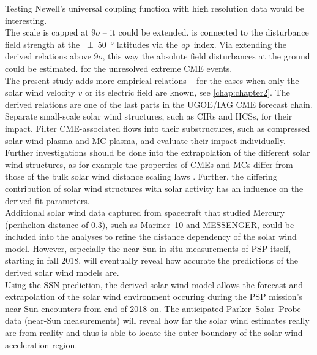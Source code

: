Testing Newell's universal coupling function with high resolution data would be interesting.\\

The \Kp{} scale is capped at $9o$ -- it could be extended. \Kp{} is connected to the disturbance field strength at the \SI{+-50}{\degree} latitudes via the \textit{ap}~index. Via extending the derived \Kp{} relations above $9o$, this way the absolute field disturbances at the ground could be estimated. for the unresolved extreme CME events.\\

The present study adds more empirical \Kp{} relations -- for the cases when only the solar wind velocity $v$ or its electric field \vBz{} are known, see \autoref{chap:chapter2}. The derived \Kp{} relations are one of the last parts in the UGOE/IAG CME forecast chain.\\

Separate small-scale solar wind structures, such as CIRs and HCSs, for their \Kp{} impact. Filter CME-associated flows into their substructures, such as compressed solar wind plasma and MC plasma, and evaluate their \Kp{} impact individually.\\


Further investigations should be done into the extrapolation of the different solar wind structures, as for example the properties of CMEs and MCs differ from those of the bulk solar wind distance scaling laws \citep{Bothmer1998}. Further, the differing contribution of solar wind structures with solar activity has an influence on the derived fit parameters.\\

Additional solar wind data captured from spacecraft that studied Mercury (perihelion distance of \SI{0.3}{\au}), such as Mariner~10 and MESSENGER, could be included into the analyses to refine the distance dependency of the solar wind model.
However, especially the near-Sun in-situ measurements of PSP itself, starting in fall 2018, will eventually reveal how accurate the predictions of the derived solar wind models are.\\

Using the SSN prediction, the derived solar wind model allows the forecast and extrapolation of the solar wind environment occuring during the PSP mission's near-Sun encounters from end of 2018 on. The anticipated Parker~Solar~Probe data (near-Sun measurements) will reveal how far the solar wind estimates really are from reality and thus is able to locate the outer boundary of the solar wind acceleration region.\\


